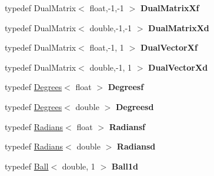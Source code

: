 \begin{DoxyCompactItemize}
\item 
\hypertarget{namespace_d_r_d_s_p_abc186929f7ed6f2c1b2736244e844656}{typedef Dual\-Matrix$<$ float,-\/1,-\/1 $>$ {\bfseries Dual\-Matrix\-Xf}}\label{namespace_d_r_d_s_p_abc186929f7ed6f2c1b2736244e844656}

\item 
\hypertarget{namespace_d_r_d_s_p_a127b24c5953f7bdca0294f6f29ce0737}{typedef Dual\-Matrix$<$ double,-\/1,-\/1 $>$ {\bfseries Dual\-Matrix\-Xd}}\label{namespace_d_r_d_s_p_a127b24c5953f7bdca0294f6f29ce0737}

\item 
\hypertarget{namespace_d_r_d_s_p_af6aa9dc643ab87d6aff42f6c0cdb0256}{typedef Dual\-Matrix$<$ float,-\/1, 1 $>$ {\bfseries Dual\-Vector\-Xf}}\label{namespace_d_r_d_s_p_af6aa9dc643ab87d6aff42f6c0cdb0256}

\item 
\hypertarget{namespace_d_r_d_s_p_a24322f5da48425ebd7a9043743c9e509}{typedef Dual\-Matrix$<$ double,-\/1, 1 $>$ {\bfseries Dual\-Vector\-Xd}}\label{namespace_d_r_d_s_p_a24322f5da48425ebd7a9043743c9e509}

\item 
\hypertarget{namespace_d_r_d_s_p_abe54d59f633e4e85a48188c95e34876b}{typedef \hyperlink{struct_d_r_d_s_p_1_1_degrees}{Degrees}$<$ float $>$ {\bfseries Degreesf}}\label{namespace_d_r_d_s_p_abe54d59f633e4e85a48188c95e34876b}

\item 
\hypertarget{namespace_d_r_d_s_p_ab1e79dc85e6cd9d62b9f6b5c2f1cf688}{typedef \hyperlink{struct_d_r_d_s_p_1_1_degrees}{Degrees}$<$ double $>$ {\bfseries Degreesd}}\label{namespace_d_r_d_s_p_ab1e79dc85e6cd9d62b9f6b5c2f1cf688}

\item 
\hypertarget{namespace_d_r_d_s_p_acc7354340bcbbf9eb3a980d4ad0a6606}{typedef \hyperlink{struct_d_r_d_s_p_1_1_radians}{Radians}$<$ float $>$ {\bfseries Radiansf}}\label{namespace_d_r_d_s_p_acc7354340bcbbf9eb3a980d4ad0a6606}

\item 
\hypertarget{namespace_d_r_d_s_p_ad0e14c53b6d31cde6b7e7f14f09aecfa}{typedef \hyperlink{struct_d_r_d_s_p_1_1_radians}{Radians}$<$ double $>$ {\bfseries Radiansd}}\label{namespace_d_r_d_s_p_ad0e14c53b6d31cde6b7e7f14f09aecfa}

\item 
\hypertarget{namespace_d_r_d_s_p_a822a7cd0ba1213411d1f053b0ff7e607}{typedef \hyperlink{struct_d_r_d_s_p_1_1_ball}{Ball}$<$ double, 1 $>$ {\bfseries Ball1d}}\label{namespace_d_r_d_s_p_a822a7cd0ba1213411d1f053b0ff7e607}


\end{DoxyCompactItemize}

